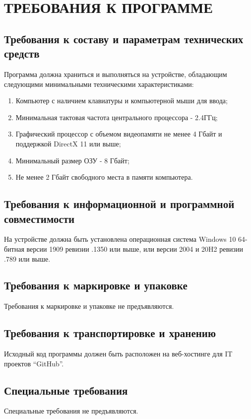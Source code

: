 \section{ТРЕБОВАНИЯ К ПРОГРАММЕ}









\subsection{Требования к составу и параметрам технических средств}

Программа должна храниться и выполняться на устройстве, обладающим следующими минимальными техническими характеристиками:

\begin{enumerate}
    \item Компьютер с наличием клавиатуры и компьютерной мыши для ввода;
    \item Минимальная тактовая частота центрального процессора - 2.4ГГц;
    \item Графический процессор с объемом видеопамяти не менее 4 Гбайт и поддержкой DirectX 11 или выше;
    \item Минимальный размер ОЗУ - 8 Гбайт;
    \item Не менее 2 Гбайт свободного места в памяти компьютера.
\end{enumerate}

\subsection{Требования к информационной и программной совместимости}

На устройстве должна быть установлена операционная система Windows 10 64-битная версии 1909 ревизии .1350 или выше, или версии 2004 и 20H2 ревизии .789 или выше.

\subsection{Требования к маркировке и упаковке}

Требования к маркировке и упаковке не предъявляются.

\subsection{Требования к транспортировке и хранению}

Исходный код программы должен быть расположен на веб-хостинге для IT проектов ``GitHub''.  

\subsection{Специальные требования}

Специальные требования не предъявляются.